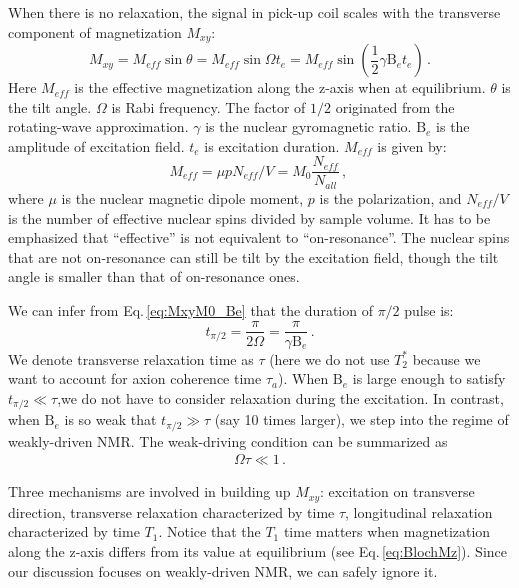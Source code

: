 When there is no relaxation, the signal in pick-up coil scales with the transverse component of magnetization $ M_{xy}$: 
\begin{equation}\label{eq:MxyM0_Be}
    M_{xy} = M_{eff} \sin \theta = M_{eff} \sin \Omega t_e 
    = M_{eff} \sin \left(\dfrac{1}{2} \gamma \mathrm{B}_e t_e \right)\,.
\end{equation}
Here $M_{eff}$ is the effective magnetization along the z-axis when at equilibrium. 
$\theta$ is the tilt angle. 
$\Omega$ is Rabi frequency. 
The factor of $1/2$ originated from the rotating-wave approximation. $\gamma$ is the nuclear gyromagnetic ratio. $\mathrm{B}_e$ is the amplitude of excitation field. $t_e$ is excitation duration. 
$M_{eff}$ is given by:
\begin{equation}
    M_{eff} = \mu p N_{eff} / V = M_0 \dfrac{N_{eff}}{N_{all}}\,,\label{eq:Meff_mu_p_Neff_V}\,
\end{equation}
where $\mu$ is the nuclear magnetic dipole moment, $p$ is the polarization, and $N_{eff} / V$ is the number of effective nuclear spins divided by sample volume. It has to be emphasized that ``effective'' is not equivalent to ``on-resonance''. The nuclear spins that are not on-resonance can still be tilt by the excitation field, though the tilt angle is smaller than that of on-resonance ones. 

We can infer from Eq.\,\eqref{eq:MxyM0_Be} that the duration of $\pi/2$ pulse is:
\begin{equation}
    t_{\pi/2}= \dfrac{\pi}{2 \Omega}= \dfrac{\pi}{ \gamma \mathrm{B}_e }\,.  \label{eq:duration_pi/2pulse}
\end{equation}
We denote transverse relaxation time as $\tau$ (here we do not use $T_2^{*}$ because we want to account for axion coherence time $\tau_a$). When $\mathrm{B}_e$ is large enough to satisfy $t_{\pi/2} \ll \tau$,we do not have to consider relaxation during the excitation. In contrast, when $\mathrm{B}_e$ is so weak that $t_{\pi/2} \gg \tau$ (say 10 times larger), we step into the regime of weakly-driven NMR. The weak-driving condition can be summarized as
\begin{align}
    \Omega \tau \ll 1\,. \label{eq:weakdriving}
\end{align}


Three mechanisms are involved in building up $M_{xy}$: excitation on transverse direction, transverse relaxation characterized by time $\tau$, longitudinal relaxation characterized by time $T_1$. Notice that the $T_1$ time matters when magnetization along the z-axis differs from its value at equilibrium (see Eq.\,\eqref{eq:BlochMz}). Since our discussion focuses on weakly-driven NMR, we can safely ignore it. %

